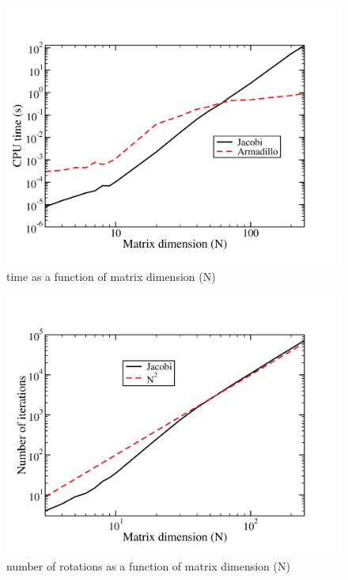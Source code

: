 \documentclass[prc,amsmath,twocolumn,superscriptaddress]{revtex4}
\begin{document}
\begin{figure}[h]
\includegraphics[scale=0.33]{N_time2.pdf}
\caption{time as a function of matrix dimension (N)}
\label{algorithm}
\end{figure}

\begin{figure}[h]
\includegraphics[scale=0.33]{N_trans.pdf}
\caption{number of rotations as a function of matrix dimension (N)}
\label{algorithm}
\end{figure}
\end{document}
